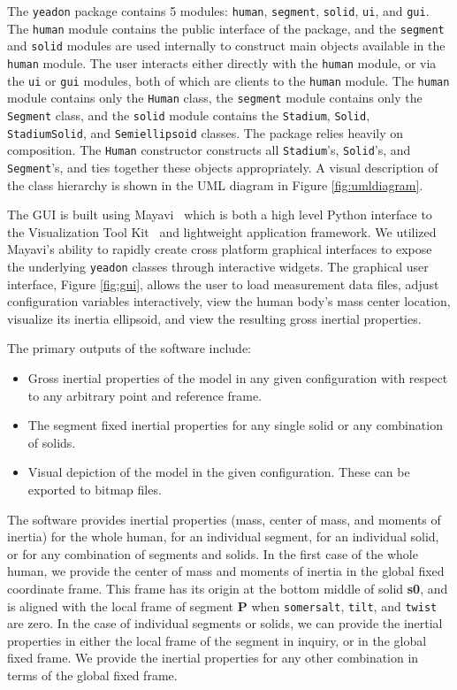 \documentclass[10pt]{article}
\begin{document}
The \verb+yeadon+ package contains 5 modules: \verb+human+, \verb+segment+,
\verb+solid+, \verb+ui+, and \verb+gui+. The \verb+human+ module contains the
public interface of the package, and the \verb+segment+ and \verb+solid+
modules are used internally to construct main objects available in the
\verb+human+ module. The user interacts either directly with the \verb+human+
module, or via the \verb+ui+ or \verb+gui+ modules, both of which are clients
to the \verb+human+ module. The \verb+human+ module contains only the
\verb+Human+ class, the \verb+segment+ module contains only the \verb+Segment+
class, and the \verb+solid+ module contains the \verb+Stadium+, \verb+Solid+,
\verb+StadiumSolid+, and \verb+Semiellipsoid+ classes. The package relies
heavily on composition. The \verb+Human+ constructor constructs all
\verb+Stadium+'s, \verb+Solid+'s, and \verb+Segment+'s, and ties together these
objects appropriately. A visual description of the class hierarchy is shown in
the UML diagram in Figure \ref{fig:umldiagram}.

The GUI is built using Mayavi~\cite{Ramachandran2011} which is both a high
level Python interface to the Visualization Tool Kit~\cite{Schroeder2006} and
lightweight application framework. We utilized Mayavi's ability to rapidly
create cross platform graphical interfaces to expose the underlying
\verb+yeadon+ classes through interactive widgets. The graphical user
interface, Figure \ref{fig:gui}, allows the user to load measurement data
files, adjust configuration variables interactively, view the human body's mass
center location, visualize its inertia ellipsoid, and view the resulting gross
inertial properties.

The primary outputs of the software include:

\begin{itemize}
  \item Gross inertial properties of the model in any given configuration with
    respect to any arbitrary point and reference frame.
  \item The segment fixed inertial properties for any single solid or any
    combination of solids.
  \item Visual depiction of the model in the given configuration. These can be
    exported to bitmap files.
\end{itemize}

The software provides inertial properties (mass, center of mass, and moments of
inertia) for the whole human, for an individual segment, for an individual
solid, or for any combination of segments and solids. In the first case of the
whole human, we provide the center of mass and moments of inertia in the global
fixed coordinate frame. This frame has its origin at the bottom middle of solid
\textbf{s0}, and is aligned with the local frame of segment \textbf{P} when
\verb+somersalt+, \verb+tilt+, and \verb+twist+ are zero. In the case of
individual segments or solids, we can provide the inertial properties in either
the local frame of the segment in inquiry, or in the global fixed frame. We
provide the inertial properties for any other combination in terms of the
global fixed frame.
\end{document}
